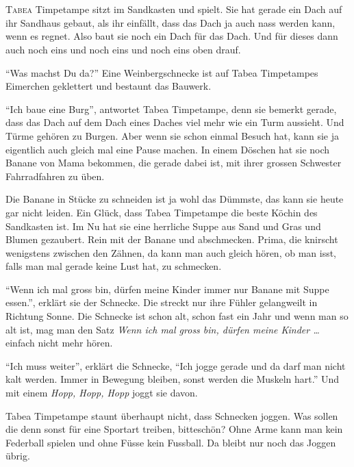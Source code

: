 \chapter*{}
\lettrine[lines=3]{\color{red}T}{abea} Timpetampe sitzt im Sandkasten und spielt. Sie hat gerade ein Dach auf ihr Sandhaus gebaut, als ihr einfällt, dass das Dach ja auch nass werden kann, wenn es regnet. Also baut sie noch ein Dach für das Dach. Und für dieses dann auch noch eins und noch eins und noch eins oben drauf.

\enquote{Was machst Du da?} Eine Weinbergschnecke ist auf Tabea Timpetampes Eimerchen geklettert und bestaunt das Bauwerk. 

\enquote{Ich baue eine Burg}, antwortet Tabea Timpetampe, denn sie bemerkt gerade, dass das Dach auf dem Dach eines Daches viel mehr wie ein Turm aussieht. Und Türme gehören zu Burgen. Aber wenn sie schon einmal Besuch hat, kann sie ja eigentlich auch gleich mal eine Pause machen. In einem Döschen hat sie noch Banane von Mama bekommen, die gerade dabei ist, mit ihrer grossen Schwester Fahrradfahren zu üben. 

Die Banane in Stücke zu schneiden ist ja wohl das Dümmste, das kann sie heute gar nicht leiden. Ein Glück, dass Tabea Timpetampe die beste Köchin des Sandkasten ist. Im Nu hat sie eine herrliche Suppe aus Sand und Gras und Blumen gezaubert. Rein mit der Banane und abschmecken. Prima, die knirscht wenigstens zwischen den Zähnen, da kann man auch gleich hören, ob man isst, falls man mal gerade keine Lust hat, zu schmecken.

\enquote{Wenn ich mal gross bin, dürfen meine Kinder immer nur Banane mit Suppe essen.}, erklärt sie der Schnecke. Die streckt nur ihre Fühler gelangweilt in Richtung Sonne. Die Schnecke ist schon alt, schon fast ein Jahr und wenn man so alt ist, mag man den Satz \textit{Wenn ich mal gross bin, dürfen meine Kinder \dots} einfach nicht mehr hören.

\enquote{Ich muss weiter}, erklärt die Schnecke, \enquote{Ich jogge gerade und da darf man nicht kalt werden. Immer in Bewegung bleiben, sonst werden die Muskeln hart.} Und mit einem \textit{Hopp, Hopp, Hopp} joggt sie  davon.

Tabea Timpetampe staunt überhaupt nicht, dass Schnecken joggen. Was sollen die denn sonst für eine Sportart treiben, bitteschön? Ohne Arme kann man kein Federball spielen und ohne Füsse kein Fussball. Da bleibt nur noch das Joggen übrig. 

